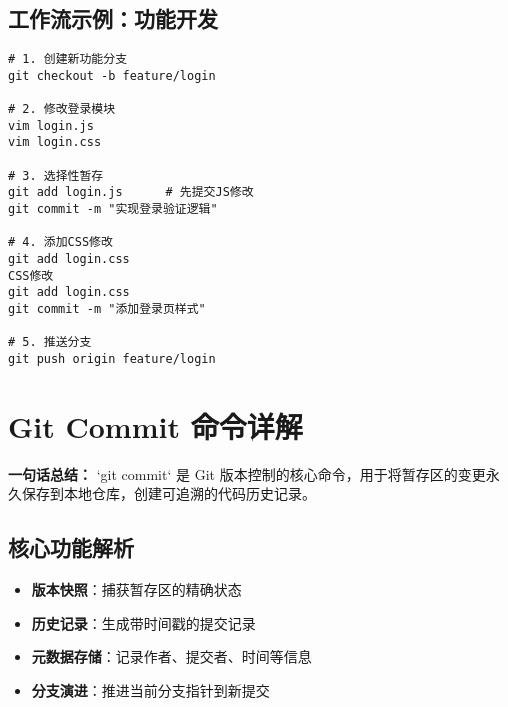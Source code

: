 \subsection{工作流示例：功能开发}
\begin{verbatim}
# 1. 创建新功能分支
git checkout -b feature/login

# 2. 修改登录模块
vim login.js
vim login.css

# 3. 选择性暂存
git add login.js      # 先提交JS修改
git commit -m "实现登录验证逻辑"

# 4. 添加CSS修改
git add login.css
CSS修改
git add login.css
git commit -m "添加登录页样式"

# 5. 推送分支
git push origin feature/login
\end{verbatim}

\section{Git Commit 命令详解}
\textbf{一句话总结：}  
`git commit` 是 Git 版本控制的核心命令，用于将暂存区的变更永久保存到本地仓库，创建可追溯的代码历史记录。

\subsection{核心功能解析}
\begin{itemize}[leftmargin=*, nosep]
    \item \textbf{版本快照}：捕获暂存区的精确状态
    \item \textbf{历史记录}：生成带时间戳的提交记录
    \item \textbf{元数据存储}：记录作者、提交者、时间等信息
    \item \textbf{分支演进}：推进当前分支指针到新提交
\end{itemize}

